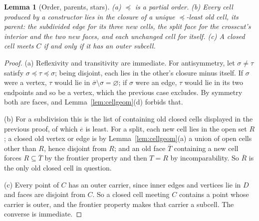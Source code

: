 \documentclass[11pt,a4paper]{article}
\theoremstyle{jsplain}
\newtheorem{lemma}[theorem]{Lemma}
\theoremstyle{jsdefn}
\begin{document}
\begin{lemma}[Order, parents, stars]\label{lem:cellorder}
\textup{(a)} $\preceq$ is a partial order.
\textup{(b)} Every cell produced by a constructor lies in the closure
of a unique $\preceq$-least old cell, its \emph{parent}: the subdivided
edge for its three new cells, the split face for the crosscut's
interior and the two new faces, and each unchanged cell for itself.
\textup{(c)} A closed cell meets $C$ if and only if it has an outer
subcell.
\end{lemma}
\begin{proof}
(a) Reflexivity and transitivity are immediate. For antisymmetry, let
$\sigma\ne\tau$ satisfy $\sigma\preceq\tau\preceq\sigma$; being
disjoint, each lies in the other's closure minus itself. If $\sigma$
were a vertex, $\tau$ would lie in $\overline\sigma\setminus
\sigma=\varnothing$; if $\sigma$ were an edge, $\tau$ would lie in its
two endpoints and so be a vertex, which the previous case excludes. By
symmetry both are faces, and Lemma~\ref{lem:cellgeom}(d) forbids that.

(b) For a subdivision this is the list of containing old closed cells
displayed in the previous proof, of which $\overline e$ is least. For a
split, each new cell lies in the open set $R$; a closed old vertex or
edge is by Lemma~\ref{lem:cellgeom}(a) a union of open cells other than
$R$, hence disjoint from $R$; and an old face $\overline T$ containing
a new cell forces $R\subseteq\overline T$ by the frontier property and
then $T=R$ by incomparability. So $\overline R$ is the only old closed
cell in question.

(c) Every point of $C$ has an outer carrier, since inner edges and
vertices lie in $D$ and faces are disjoint from $C$. So a closed cell
meeting $C$ contains a point whose carrier is outer, and the frontier
property makes that carrier a subcell. The converse is immediate.
\end{proof}
\end{document}
